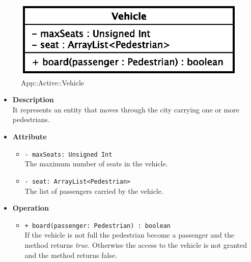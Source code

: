 \begin{figure}[h]
\centering
\includegraphics[scale=0.6,keepaspectratio]{images/solution/vehicle.eps}
\caption{App::Active::Vehicle}
\label{fig:sd-app-vehicle}
\end{figure}
\begin{itemize}
  \item \textbf{Description} \\
    It represents an entity that moves through the city carrying one or more
pedestrians.
  \item \textbf{Attribute}
  \begin{itemize}
    \item \texttt{- maxSeats: Unsigned Int} \\
The maximum number of seats in the vehicle.
    \item \texttt{- seat: ArrayList<Pedestrian>} \\
The list of passengers carried by the vehicle.
  \end{itemize}
  \item \textbf{Operation}
  \begin{itemize} 
    \item \texttt{+ board(passenger: Pedestrian) : boolean} \\
If the vehicle is not full the pedestrian become a passenger and the method returns \textit{true}.
Otherwise the access to the vehicle is not granted and the method returns false.
  \end{itemize}
\end{itemize}

